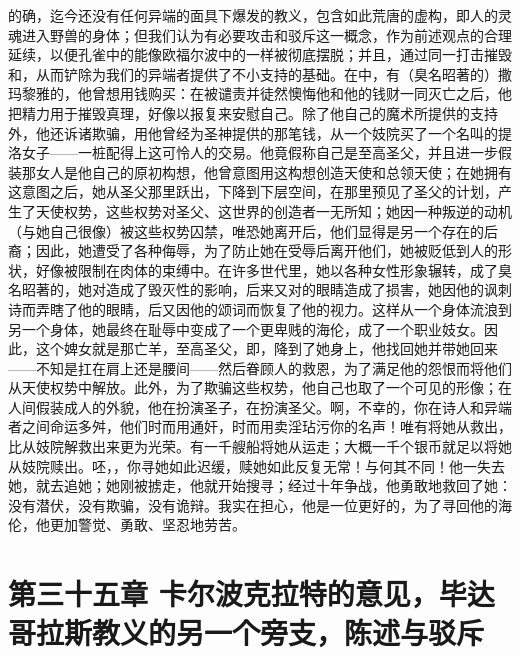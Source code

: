 的确，迄今还没有任何异端的面具下爆发的教义，包含如此荒唐的虚构，即人的灵魂进入野兽的身体；但我们认为有必要攻击和驳斥这一概念，作为前述观点的合理延续，以便孔雀中的能像欧福尔波中的一样被彻底摆脱；并且，通过同一打击摧毁和，从而铲除为我们的异端者提供了不小支持的基础。在中，有（臭名昭著的）撒玛黎雅的，他曾想用钱购买：在被谴责并徒然懊悔他和他的钱财一同灭亡之后，他把精力用于摧毁真理，好像以报复来安慰自己。除了他自己的魔术所提供的支持外，他还诉诸欺骗，用他曾经为圣神提供的那笔钱，从一个妓院买了一个名叫的提洛女子——一桩配得上这可怜人的交易。他竟假称自己是至高圣父，并且进一步假装那女人是他自己的原初构想，他曾意图用这构想创造天使和总领天使；在她拥有这意图之后，她从圣父那里跃出，下降到下层空间，在那里预见了圣父的计划，产生了天使权势，这些权势对圣父、这世界的创造者一无所知；她因一种叛逆的动机（与她自己很像）被这些权势囚禁，唯恐她离开后，他们显得是另一个存在的后裔；因此，她遭受了各种侮辱，为了防止她在受辱后离开他们，她被贬低到人的形状，好像被限制在肉体的束缚中。在许多世代里，她以各种女性形象辗转，成了臭名昭著的，她对造成了毁灭性的影响，后来又对的眼睛造成了损害，她因他的讽刺诗而弄瞎了他的眼睛，后又因他的颂词而恢复了他的视力。这样从一个身体流浪到另一个身体，她最终在耻辱中变成了一个更卑贱的海伦，成了一个职业妓女。因此，这个婢女就是那亡羊，至高圣父，即，降到了她身上，他找回她并带她回来——不知是扛在肩上还是腰间——然后眷顾人的救恩，为了满足他的怨恨而将他们从天使权势中解放。此外，为了欺骗这些权势，他自己也取了一个可见的形像；在人间假装成人的外貌，他在扮演圣子，在扮演圣父。啊，不幸的，你在诗人和异端者之间命运多舛，他们时而用通奸，时而用卖淫玷污你的名声！唯有将她从救出，比从妓院解救出来更为光荣。有一千艘船将她从运走；大概一千个银币就足以将她从妓院赎出。呸，，你寻她如此迟缓，赎她如此反复无常！与何其不同！他一失去她，就去追她；她刚被掳走，他就开始搜寻；经过十年争战，他勇敢地救回了她：没有潜伏，没有欺骗，没有诡辩。我实在担心，他是一位更好的，为了寻回他的海伦，他更加警觉、勇敢、坚忍地劳苦。\par


\section{第三十五章 卡尔波克拉特的意见，毕达哥拉斯教义的另一个旁支，陈述与驳斥}

